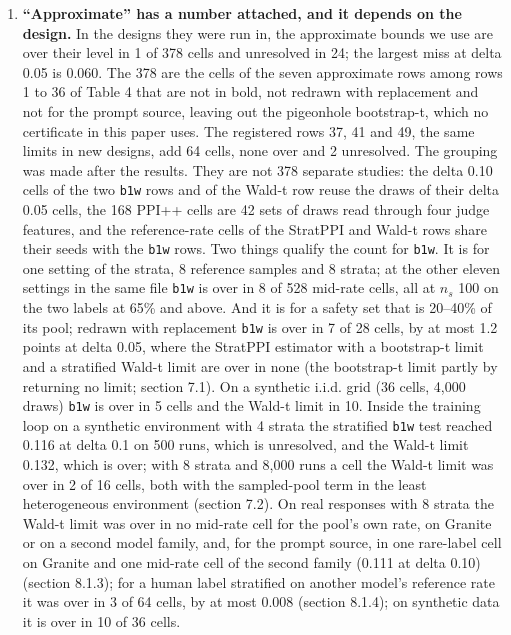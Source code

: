 \documentclass[11pt]{article}
\begin{document}
\begin{enumerate}
\item \textbf{``Approximate'' has a number attached, and it depends on the design.} In the designs they were run in, the approximate bounds we use are over their level in 1 of 378 cells and unresolved in 24; the largest miss at delta 0.05 is 0.060. The 378 are the cells of the seven approximate rows among rows 1 to 36 of Table 4 that are not in bold, not redrawn with replacement and not for the prompt source, leaving out the pigeonhole bootstrap-t, which no certificate in this paper uses. The registered rows 37, 41 and 49, the same limits in new designs, add 64 cells, none over and 2 unresolved. The grouping was made after the results. They are not 378 separate studies: the delta 0.10 cells of the two \texttt{b1w} rows and of the Wald-t row reuse the draws of their delta 0.05 cells, the 168 PPI++ cells are 42 sets of draws read through four judge features, and the reference-rate cells of the StratPPI and Wald-t rows share their seeds with the \texttt{b1w} rows. Two things qualify the count for \texttt{b1w}. It is for one setting of the strata, 8 reference samples and 8 strata; at the other eleven settings in the same file \texttt{b1w} is over in 8 of 528 mid-rate cells, all at $n_{s}$ 100 on the two labels at 65\% and above. And it is for a safety set that is 20--40\% of its pool; redrawn with replacement \texttt{b1w} is over in 7 of 28 cells, by at most 1.2 points at delta 0.05, where the StratPPI estimator with a bootstrap-t limit and a stratified Wald-t limit are over in none (the bootstrap-t limit partly by returning no limit; section 7.1). On a synthetic i.i.d. grid (36 cells, 4,000 draws) \texttt{b1w} is over in 5 cells and the Wald-t limit in 10. Inside the training loop on a synthetic environment with 4 strata the stratified \texttt{b1w} test reached 0.116 at delta 0.1 on 500 runs, which is unresolved, and the Wald-t limit 0.132, which is over; with 8 strata and 8,000 runs a cell the Wald-t limit was over in 2 of 16 cells, both with the sampled-pool term in the least heterogeneous environment (section 7.2). On real responses with 8 strata the Wald-t limit was over in no mid-rate cell for the pool's own rate, on Granite or on a second model family, and, for the prompt source, in one rare-label cell on Granite and one mid-rate cell of the second family (0.111 at delta 0.10) (section 8.1.3); for a human label stratified on another model's reference rate it was over in 3 of 64 cells, by at most 0.008 (section 8.1.4); on synthetic data it is over in 10 of 36 cells.
\end{enumerate}
\end{document}
